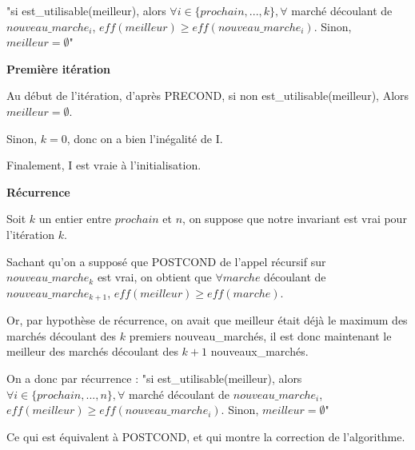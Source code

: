 "si est\_utilisable(meilleur), alors $\forall i \in \{prochain, ..., k\}, \forall $ marché découlant de $nouveau\_marche_i$, $eff(meilleur) \geq eff(nouveau\_marche_i)$. Sinon, $meilleur = \emptyset$"

\textbf{Première itération}

Au début de l'itération, d'après PRECOND, si non est\_utilisable(meilleur), Alors $meilleur = \emptyset$.

Sinon, $k = 0$, donc on a bien l'inégalité de I.

Finalement, I est vraie à l'initialisation.

\textbf{Récurrence}

Soit $k$ un entier entre $prochain$ et $n$, on suppose que notre invariant est vrai pour l'itération $k$.

Sachant qu'on a supposé que POSTCOND de l'appel récursif sur $nouveau\_marche_k$ est vrai, on obtient que $\forall  marche$ découlant de $nouveau\_marche_{k + 1}$, $eff(meilleur) \geq eff(marche)$.

Or, par hypothèse de récurrence, on avait que meilleur était déjà le maximum des marchés découlant des $k$ premiers nouveau\_marchés, il est donc maintenant le meilleur des marchés découlant des $k + 1$ nouveaux\_marchés.

On a donc par récurrence :
"si est\_utilisable(meilleur), alors $\forall i \in \{prochain, ..., n\}, \forall $ marché découlant de $nouveau\_marche_i$, $eff(meilleur) \geq eff(nouveau\_marche_i)$. Sinon, $meilleur = \emptyset$"

Ce qui est équivalent à POSTCOND, et qui montre la correction de l'algorithme.
